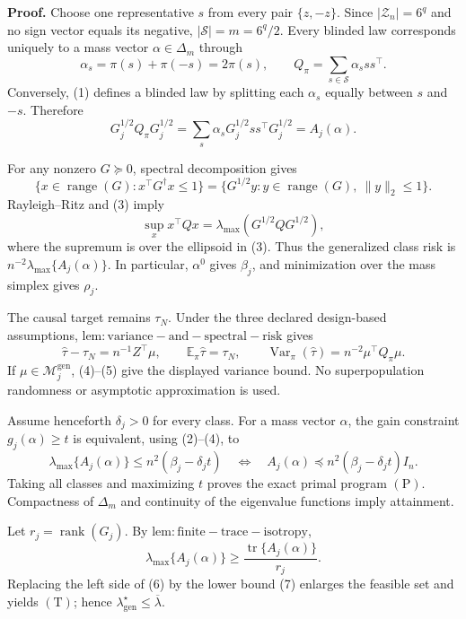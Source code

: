 \textbf{Proof.}
Choose one representative \(s\) from every pair \(\{z,-z\}\).  Since \(|\mathcal Z_n|=6^q\) and no sign vector equals its negative, \(|\mathscr S|=m=6^q/2\).  Every blinded law corresponds uniquely to a mass vector \(\alpha\in\Delta_m\) through
\[
\alpha_s=\pi(s)+\pi(-s)=2\pi(s),
\qquad
Q_\pi=\sum_{s\in\mathscr S}\alpha_sss^\top. \tag{1}
\]
Conversely, (1) defines a blinded law by splitting each \(\alpha_s\) equally between \(s\) and \(-s\).  Therefore
\[
G_j^{1/2}Q_\pi G_j^{1/2}
=\sum_s\alpha_sG_j^{1/2}ss^\top G_j^{1/2}
=A_j(\alpha). \tag{2}
\]

For any nonzero \(G\succeq0\), spectral decomposition gives
\[
\{x\in\operatorname{range}(G):x^\top G^\dagger x\le1\}
=\{G^{1/2}y:y\in\operatorname{range}(G),\ \|y\|_2\le1\}. \tag{3}
\]
Rayleigh--Ritz and (3) imply
\[
\sup_x x^\top Qx=\lambda_{\max}(G^{1/2}QG^{1/2}), \tag{4}
\]
where the supremum is over the ellipsoid in (3).  Thus the generalized class risk is \(n^{-2}\lambda_{\max}\{A_j(\alpha)\}\).  In particular, \(\alpha^0\) gives \(\beta_j\), and minimization over the mass simplex gives \(\rho_j\).

The causal target remains \(\tau_N\).  Under the three declared design-based assumptions, \(\mathrm{lem:variance-and-spectral-risk}\) gives
\[
\widehat\tau-\tau_N=n^{-1}Z^\top\mu,
\qquad
\mathbb E_\pi\widehat\tau=\tau_N,
\qquad
\operatorname{Var}_\pi(\widehat\tau)=n^{-2}\mu^\top Q_\pi\mu. \tag{5}
\]
If \(\mu\in\mathcal M_j^{\mathrm{gen}}\), (4)--(5) give the displayed variance bound.  No superpopulation randomness or asymptotic approximation is used.

Assume henceforth \(\delta_j>0\) for every class.  For a mass vector \(\alpha\), the gain constraint \(g_j(\alpha)\ge t\) is equivalent, using (2)--(4), to
\[
\lambda_{\max}\{A_j(\alpha)\}
\le n^2(\beta_j-\delta_jt)
\quad\Longleftrightarrow\quad
A_j(\alpha)\preceq n^2(\beta_j-\delta_jt)I_n. \tag{6}
\]
Taking all classes and maximizing \(t\) proves the exact primal program \((\mathrm P)\).  Compactness of \(\Delta_m\) and continuity of the eigenvalue functions imply attainment.

Let \(r_j=\operatorname{rank}(G_j)\).  By \(\mathrm{lem:finite-trace-isotropy}\),
\[
\lambda_{\max}\{A_j(\alpha)\}
\ge\frac{\operatorname{tr}\{A_j(\alpha)\}}{r_j}. \tag{7}
\]
Replacing the left side of (6) by the lower bound (7) enlarges the feasible set and yields \((\mathrm T)\); hence \(\lambda_{\mathrm{gen}}^\star\le\overline\lambda\).

